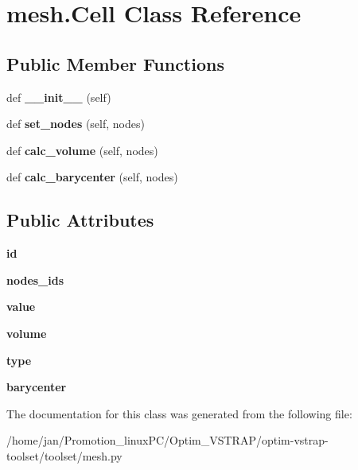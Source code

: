\hypertarget{classmesh_1_1Cell}{}\section{mesh.\+Cell Class Reference}
\label{classmesh_1_1Cell}
\subsection*{Public Member Functions}
\begin{DoxyCompactItemize}
\item 
\mbox{\label{classmesh_1_1Cell_a6c61268b0162ea1a3323c1def2bc505a}} 
def {\bfseries \+\_\+\+\_\+init\+\_\+\+\_\+} (self)
\item 
\mbox{\label{classmesh_1_1Cell_abb04a423222f1f5ccbf1700249f75f90}} 
def {\bfseries set\+\_\+nodes} (self, nodes)
\item 
\mbox{\label{classmesh_1_1Cell_ab4c0e290a8b94f1bf46507c3fb56a0ea}} 
def {\bfseries calc\+\_\+volume} (self, nodes)
\item 
\mbox{\label{classmesh_1_1Cell_afcaf55fc2ee39266624ecb7439a8ce6a}} 
def {\bfseries calc\+\_\+barycenter} (self, nodes)
\end{DoxyCompactItemize}
\subsection*{Public Attributes}
\begin{DoxyCompactItemize}
\item 
\mbox{\label{classmesh_1_1Cell_a0c625c512240ebff7d8426b17300f1c1}} 
{\bfseries id}
\item 
\mbox{\label{classmesh_1_1Cell_a205e213f2e3f1b1290787f93e4f0f5c0}} 
{\bfseries nodes\+\_\+ids}
\item 
\mbox{\label{classmesh_1_1Cell_a030dce3c25e3f14db97bebc69a75101c}} 
{\bfseries value}
\item 
\mbox{\label{classmesh_1_1Cell_ad7fc1b9f8868b77bbb387b9207004e93}} 
{\bfseries volume}
\item 
\mbox{\label{classmesh_1_1Cell_a19509c56b82d6c920fd15b83f5eb6202}} 
{\bfseries type}
\item 
\mbox{\label{classmesh_1_1Cell_ad890a38b19a74dc227f535756f0583b3}} 
{\bfseries barycenter}
\end{DoxyCompactItemize}


The documentation for this class was generated from the following file\+:\begin{DoxyCompactItemize}
\item 
/home/jan/\+Promotion\+\_\+linux\+P\+C/\+Optim\+\_\+\+V\+S\+T\+R\+A\+P/optim-\/vstrap-\/toolset/toolset/mesh.\+py\end{DoxyCompactItemize}
